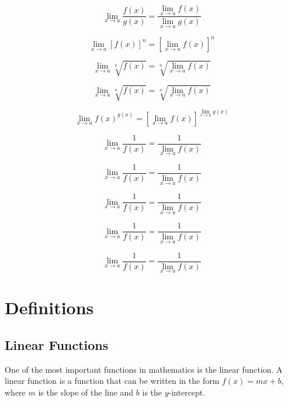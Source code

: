 \documentclass{book}
\begin{document}
\begin{equation}
    \lim_{x \to a} \frac{f(x)}{g(x)} = \frac{\lim_{x \to a} f(x)}{\lim_{x \to a} g(x)}
\end{equation}

\begin{equation}
    \lim_{x \to a} [f(x)]^n = [\lim_{x \to a} f(x)]^n
\end{equation}

\begin{equation}
    \lim_{x \to a} \sqrt[n]{f(x)} = \sqrt[n]{\lim_{x \to a} f(x)}
\end{equation}

\begin{equation}
    \lim_{x \to a} \sqrt[n]{f(x)} = \sqrt[n]{\lim_{x \to a} f(x)}
\end{equation}

\begin{equation}
    \lim_{x \to a} f(x)^{g(x)} = \left[\lim_{x \to a} f(x)\right]^{\lim_{x \to a} g(x)}
\end{equation}

\begin{equation}
    \lim_{x \to a} \frac{1}{f(x)} = \frac{1}{\lim_{x \to a} f(x)}
\end{equation}

\begin{equation}
    \lim_{x \to a} \frac{1}{f(x)} = \frac{1}{\lim_{x \to a} f(x)}
\end{equation}

\begin{equation}
    \lim_{x \to a} \frac{1}{f(x)} = \frac{1}{\lim_{x \to a} f(x)}
\end{equation}

\begin{equation}
    \lim_{x \to a} \frac{1}{f(x)} = \frac{1}{\lim_{x \to a} f(x)}
\end{equation}

\begin{equation}
    \lim_{x \to a} \frac{1}{f(x)} = \frac{1}{\lim_{x \to a} f(x)}
\end{equation}

\chapter{Definitions}
\section{Linear Functions}
One of the most important functions in mathematics is the linear function. A linear function is a function that can be written in the form $f(x) = mx + b$, where $m$ is the slope of the line and $b$ is the $y$-intercept.
\end{document}
